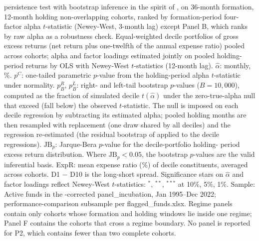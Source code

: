 \begin{singlespace}\footnotesize\noindent
\textcite{Carhart1997} persistence test with bootstrap inference in the spirit of \textcite{KosowskiTimmermannWermersWhite2006}, on 36-month formation, 12-month holding non-overlapping cohorts, ranked by formation-period \textcite{Carhart1997} four-factor alpha $t$-statistic (Newey-West, 3-month lag) except Panel B, which ranks by raw alpha as a robustness check. Equal-weighted decile portfolios of gross excess returns (net return plus one-twelfth of the annual expense ratio) pooled across cohorts; alpha and factor loadings estimated jointly on pooled holding-period returns by OLS with Newey-West $t$-statistics (12-month lag). $\hat{\alpha}$: monthly, \%. $p^C$: one-tailed parametric $p$-value from the holding-period alpha $t$-statistic under normality. $p^R_B$, $p^L_B$: right- and left-tail bootstrap $p$-values ($B = 10{,}000$), computed as the fraction of simulated decile $t(\hat{\alpha})$ under the zero-true-alpha null that exceed (fall below) the observed $t$-statistic. The null is imposed on each decile regression by subtracting its estimated alpha; pooled holding months are then resampled with replacement (one draw shared by all deciles) and the regression re-estimated (the residual bootstrap of \textcite{FamaFrench2010} applied to the decile regressions). $\text{JB}_p$: Jarque-Bera $p$-value for the decile-portfolio holding- period excess return distribution. Where $\text{JB}_p < 0.05$, the bootstrap $p$-values are the valid inferential basis. ExpR: mean expense ratio (\%) of decile constituents, averaged across cohorts. D1 $-$ D10 is the long-short spread. Significance stars on $\hat{\alpha}$ and factor loadings reflect Newey-West $t$-statistics: $^{*}$, $^{**}$, $^{***}$ at 10\%, 5\%, 1\%. Sample: Active funds in the \textcite{Evans2010}-corrected panel\_incubation, Jan 1995--Dec 2022; performance-comparison subsample per flagged\_funds.xlsx. Regime panels contain only cohorts whose formation and holding windows lie inside one regime; Panel F contains the cohorts that cross a regime boundary. No panel is reported for P2, which contains fewer than two complete cohorts.
\end{singlespace}


